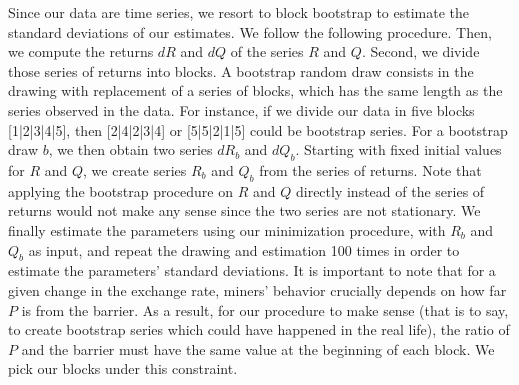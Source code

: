 \documentclass[12pt, a4paper]{article}
\makeatletter
\renewcommand{\section}{\@startsection{section}{2}{0mm}{-0.8\baselineskip}{.5\baselineskip}{\normalfont\large\bfseries}}
\makeatother
\begin{document}
%
%
%
%

\section{Block bootstrap}
\label{app:block_bootstrap}

Since our data are time series, we resort to block bootstrap to estimate the standard deviations of our estimates. We follow the following procedure. Then, we compute the returns $dR$ and $dQ$ of the series $R$ and $Q$. Second, we divide those series of returns into blocks. A bootstrap random draw consists in the drawing with replacement of a series of blocks, which has the same length as the series observed in the data. For instance, if we divide our data in five blocks [1|2|3|4|5], then [2|4|2|3|4] or [5|5|2|1|5] could be bootstrap series. For a bootstrap draw $b$, we then obtain two series $dR_b$ and $dQ_b$. Starting with fixed initial values for $R$ and $Q$, we create series $R_b$ and $Q_b$ from the series of returns. Note that applying the bootstrap procedure on $R$ and $Q$ directly instead of the series of returns would not make any sense since the two series are not stationary. We finally estimate the parameters using our minimization procedure, with $R_b$ and $Q_b$ as input, and repeat the drawing and estimation 100 times in order to estimate the parameters' standard deviations.
It is important to note that for a given change in the exchange rate, miners' behavior crucially depends on how far $P$ is from the barrier. As a result, for our procedure to make sense (that is to say, to create bootstrap series which could have happened in the real life), the ratio of $P$ and the barrier must have the same value at the beginning of each block. We pick our blocks under this constraint.
\end{document}
